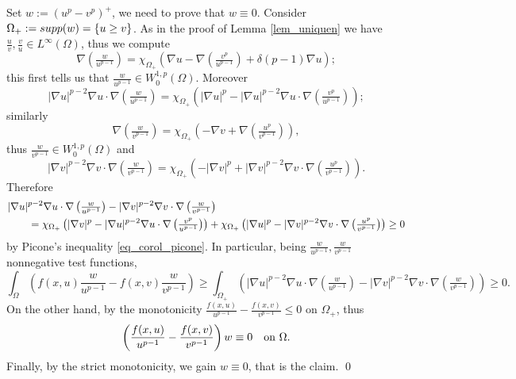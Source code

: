\documentclass[11pt, reqno]{amsart}
\theoremstyle{definition}
\numberwithin{equation}{section}
\renewenvironment{proof}[1][\proofname]{\medskip \noindent {\bfseries #1. }}{\qed \bigskip}
\begin{document}
\begin{proof}
Set $w:= (u^p-v^p)^+$, we need to prove that $w\equiv 0$. Consider $\Omega_+:= \textup{supp}(w)=\{u \geq v\}$.
As in the proof of Lemma \ref{lem_uniquen} we have $\frac{u}{v}, \frac{v}{u} \in L^{\infty}(\Omega)$,
thus we compute
$$\nabla \left(\tfrac{w}{u^{p-1}}\right) = \chi_{\Omega_+} \left( \nabla u - \nabla \left(\tfrac{v^p}{u^{p-1}}\right) + \delta (p-1) \nabla u\right);$$
this first tells us that $\frac{w}{u^{p-1}} \in W^{1,p}_0(\Omega)$. Moreover
$$|\nabla u|^{p-2} \nabla u \cdot \nabla \left(\tfrac{w}{u^{p-1}}\right) = \chi_{\Omega_+} \left( |\nabla u|^p - |\nabla u|^{p-2} \nabla u \cdot \nabla \left(\tfrac{v^p}{u^{p-1}}\right)\right);$$
similarly 
$$\nabla \left(\tfrac{w}{v^{p-1}}\right) = \chi_{\Omega_+} \left( -\nabla v + \nabla \left(\tfrac{u^p}{v^{p-1}}\right)\right),$$
thus $\frac{w}{v^{p-1}} \in W^{1,p}_0(\Omega)$ and
$$|\nabla v|^{p-2} \nabla v \cdot \nabla \left(\tfrac{w}{v^{p-1}}\right) = \chi_{\Omega_+} \left( - |\nabla v|^p + |\nabla v|^{p-2} \nabla v \cdot \nabla \left(\tfrac{u^p}{v^{p-1}}\right)\right).$$
Therefore
\begin{align*}
\MoveEqLeft |\nabla u|^{p-2} \nabla u \cdot \nabla \left(\tfrac{w}{u^{p-1}}\right) - |\nabla v|^{p-2} \nabla v \cdot \nabla \left(\tfrac{w}{v^{p-1}}\right) \\
& = \chi_{\Omega_+} \left( |\nabla v|^p - |\nabla u|^{p-2} \nabla u \cdot \nabla \left(\tfrac{v^p}{u^{p-1}}\right)\right)
+ \chi_{\Omega_+} \left( |\nabla u|^p - |\nabla v|^{p-2} \nabla v \cdot \nabla \left(\tfrac{u^p}{v^{p-1}}\right)\right) 
\geq 0
\end{align*}
by Picone's inequality \eqref{eq_corol_picone}. 
 In particular, being $\frac{w}{u^{p-1}}, \frac{w}{v^{p-1}}$ nonnegative test functions,
$$\int_{\Omega} \left( f(x,u) \frac{w}{u^{p-1}} - f(x,v) \frac{w}{v^{p-1}}\right) \geq \int_{\Omega_+} \left( |\nabla u|^{p-2} \nabla u \cdot \nabla \left(\tfrac{w}{u^{p-1}}\right) - |\nabla v|^{p-2} \nabla v \cdot \nabla \left(\tfrac{w}{v^{p-1}}\right) \right) \geq 0.$$
On the other hand, by the monotonicity $\frac{f(x,u)}{u^{p-1}} - \frac{f(x,v)}{v^{p-1}} \leq 0$ on $\Omega_+$, 
thus
$$ \left( \frac{f(x,u)}{u^{p-1}} - \frac{f(x,v)}{v^{p-1}}\right) w \equiv 0 \quad \hbox{on $\Omega$}.$$
Finally, by the strict monotonicity, we gain $w \equiv 0$, that is the claim.
\end{proof} 
\end{document}
